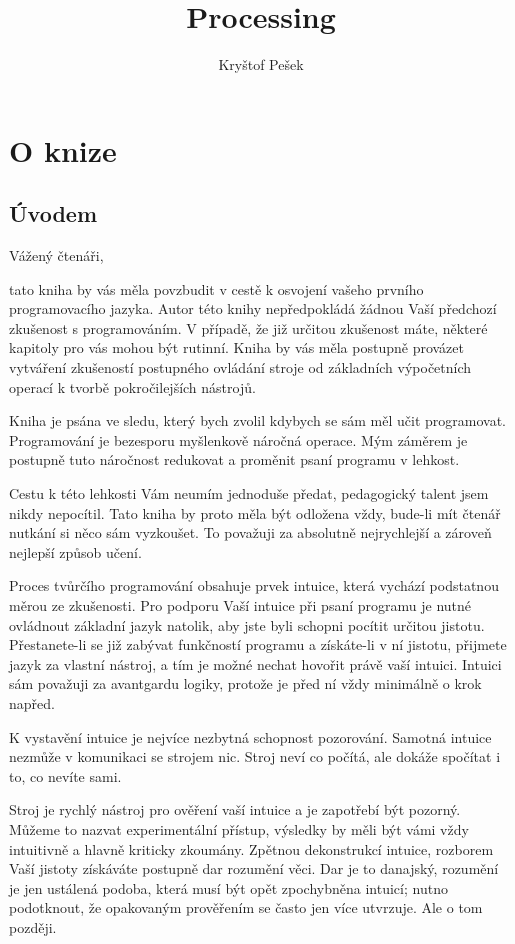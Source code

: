 \documentclass[11pt]{book}
\title{Processing}
\author{Kryštof Pešek}
\date{} %
\newcommand{\oddil}[1]{\section{#1}\label{sec:#1}}
\begin{document}

\tableofcontents


\chapter{O knize}



\vfill
\thispagestyle{empty}


\oddil{Úvodem}




Vážený čtenáři,

tato kniha by vás měla povzbudit v cestě k osvojení vašeho prvního programovacího jazyka. Autor této knihy nepředpokládá žádnou Vaší předchozí zkušenost s programováním. V případě, že již určitou zkušenost máte, některé kapitoly pro vás mohou být rutinní. Kniha by vás měla postupně provázet vytváření zkušeností postupného ovládání stroje od základních výpočetních operací k tvorbě pokročilejších nástrojů.

Kniha je psána ve sledu, který bych zvolil kdybych se sám měl učit programovat. Programování je bezesporu myšlenkově náročná operace. Mým záměrem je postupně tuto náročnost redukovat a proměnit psaní programu v lehkost.

Cestu k této lehkosti Vám neumím jednoduše předat, pedagogický talent jsem nikdy nepocítil. Tato kniha by proto měla být odložena vždy, bude-li mít čtenář nutkání si něco sám vyzkoušet. To považuji za absolutně nejrychlejší a zároveň nejlepší způsob učení.

Proces tvůrčího programování obsahuje prvek intuice, která vychází podstatnou měrou ze zkušenosti. Pro podporu Vaší intuice při psaní programu je nutné ovládnout základní jazyk natolik, aby jste byli schopni pocítit určitou jistotu. Přestanete-li se již zabývat funkčností programu a získáte-li v ní jistotu, přijmete jazyk za vlastní nástroj, a tím je možné nechat hovořit právě vaší intuici. Intuici sám považuji za avantgardu logiky, protože je před ní vždy minimálně o krok napřed.

K vystavění intuice je nejvíce nezbytná schopnost pozorování. Samotná intuice nezmůže v komunikaci se strojem nic. Stroj neví co počítá, ale dokáže spočítat i to, co nevíte sami.

Stroj je rychlý nástroj pro ověření vaší intuice a je zapotřebí být pozorný. Můžeme to nazvat experimentální přístup, výsledky by měli být vámi vždy intuitivně a hlavně kriticky zkoumány. Zpětnou dekonstrukcí intuice, rozborem Vaší jistoty získáváte postupně dar rozumění věci. Dar je to danajský, rozumění je jen ustálená podoba, která musí být opět zpochybněna intuicí; nutno podotknout, že opakovaným prověřením se často jen více utvrzuje. Ale o tom později.
\end{document}
